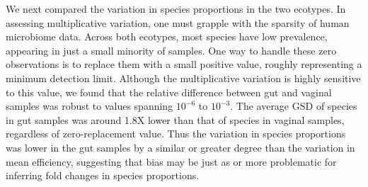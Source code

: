\documentclass[
]{article}
\begin{document}
We next compared the variation in species proportions in the two ecotypes.
In assessing multiplicative variation, one must grapple with the sparsity of human microbiome data.
Across both ecotypes, most species have low prevalence, appearing in just a small minority of samples.
One way to handle these zero observations is to replace them with a small positive value, roughly representing a minimum detection limit.
Although the multiplicative variation is highly sensitive to this value, we found that the relative difference between gut and vaginal samples was robust to values spanning \(10^{-6}\) to \(10^{-3}\).
The average GSD of species in gut samples was around 1.8X lower than that of species in vaginal samples, regardless of zero-replacement value.
Thus the variation in species proportions was lower in the gut samples by a similar or greater degree than the variation in mean efficiency, suggesting that bias may be just as or more problematic for inferring fold changes in species proportions.
\end{document}

